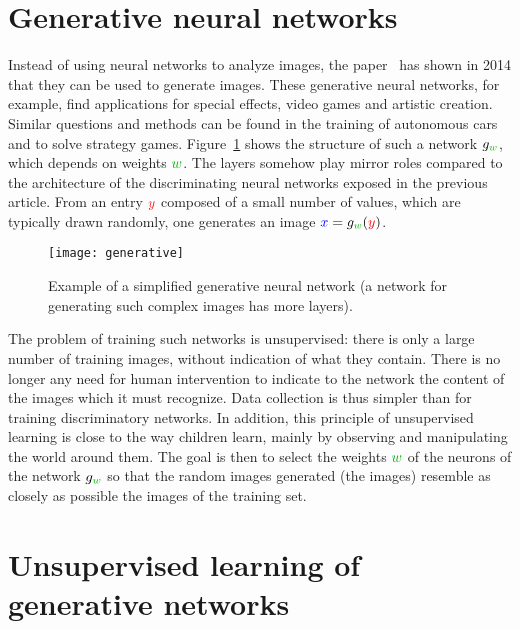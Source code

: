 


\section{Generative neural networks}

Instead of using neural networks to analyze images, the paper~\cite{goodfellow2014generative} has shown in 2014 that they can be used  to generate images.
%
These generative neural networks, for example, find applications for special effects, video games and artistic creation.
%
Similar questions and methods can be found in the training of autonomous cars and to solve strategy games.
%
Figure~\ref{fig:generative} shows the structure of such a network $g_{\mygreen{w}}$, which depends on weights $\mygreen{w}$. The layers somehow play mirror roles compared to the architecture of the discriminating neural networks exposed in the previous article.
%
From an entry ${\color{red} y}$ composed of a small number of values, which are typically drawn randomly, one generates an image ${\color{blue} x} = g_{\mygreen{ w}}({\color{red} y})$.

\begin{figure}\centering
	\texttt{[image: generative]}
\caption{\label{fig:generative} Example of a simplified generative neural network (a network for generating such complex images has more layers).  }
\end{figure}

The problem of training such networks is unsupervised: there is only a large number of training images, without indication of what they contain.
%
There is no longer any need for human intervention to indicate to the network the content of the images which it must recognize.
Data collection is thus simpler than for training discriminatory networks. In addition, this principle of unsupervised learning is close to the way children learn, mainly by observing and manipulating the world around them.
%
The goal is then to select the weights $\mygreen{w}$ of the neurons of the network $g_\mygreen{w}$ so that the random images generated (the  images) resemble as closely as possible the images of the training set.

\section{Unsupervised learning of generative networks}
\label{sec-app-gen}

